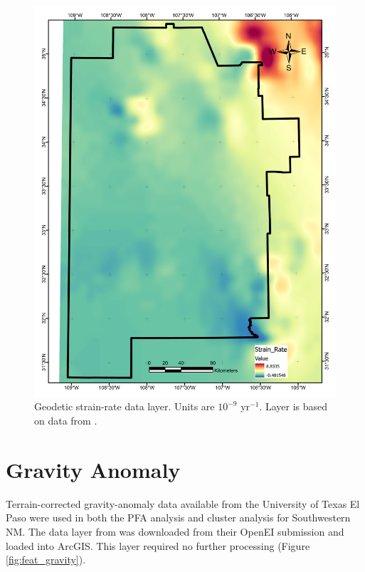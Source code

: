 \begin{figure}[H]
\centering
\includegraphics[width=0.75\linewidth]{templates/images/Figure-StrainRate.pdf}
\caption[Geodetic strain rate data layer]{Geodetic strain-rate data layer. Units are $10^{-9}$ yr$^{-1}$. Layer is based on data from \protect\citet{kreemer_geodetic_2014}.}
\label{fig:feat_strain}
\end{figure}

\section{Gravity Anomaly}\label{app:dl_grav_anomaly}

Terrain-corrected gravity-anomaly data available from the University of Texas El Paso \citep{utep_gravity_2011} were used in both the PFA analysis \citep{bielicki_hydrogeolgic_2015} and cluster analysis \citep{pepin_new_2019} for Southwestern NM. The data layer from \citet{bielicki_hydrogeolgic_2015} was downloaded from their OpenEI submission \citep{kelley_geothermal_2015} and loaded into ArcGIS. This layer required no further processing (Figure \ref{fig:feat_gravity}).

